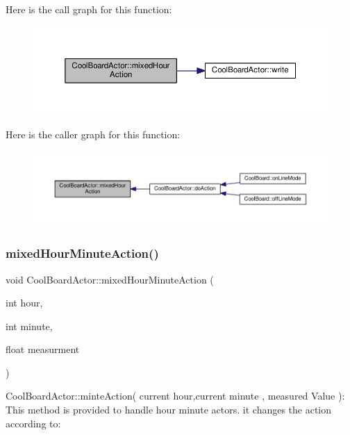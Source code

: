 Here is the call graph for this function\+:
\nopagebreak
\begin{figure}[H]
\begin{center}
\leavevmode
\includegraphics[width=350pt]{dc/d69/class_cool_board_actor_a6d93a24502c56ced2ef7675c913a276b_cgraph}
\end{center}
\end{figure}
Here is the caller graph for this function\+:
\nopagebreak
\begin{figure}[H]
\begin{center}
\leavevmode
\includegraphics[width=350pt]{dc/d69/class_cool_board_actor_a6d93a24502c56ced2ef7675c913a276b_icgraph}
\end{center}
\end{figure}
\mbox{\label{class_cool_board_actor_ae6b2a17b0e73cfeb353ded2cc4e08109}} 
\subsubsection{\texorpdfstring{mixed\+Hour\+Minute\+Action()}{mixedHourMinuteAction()}}
{\footnotesize\ttfamily void Cool\+Board\+Actor\+::mixed\+Hour\+Minute\+Action (\begin{DoxyParamCaption}\item[{int}]{hour,  }\item[{int}]{minute,  }\item[{float}]{measurment }\end{DoxyParamCaption})}

Cool\+Board\+Actor\+::minte\+Action( current hour,current minute , measured Value )\+: This method is provided to handle hour minute actors. it changes the action according to\+:

